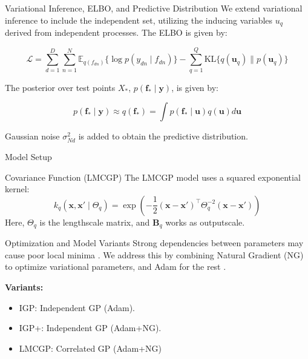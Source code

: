 \begin{frame}{Variational Inference, ELBO, and Predictive Distribution}
	We extend variational inference to include the independent set, utilizing the inducing variables $u_q$ derived from independent processes. The ELBO is given by:
	
	\begin{equation*}\label{eq:lmc_elbo}
		\mathcal{L} = \sum_{d=1}^D\sum_{n=1}^{N} \mathbb{E}_{q(f_{dn})}\{\log p(y_{dn} \mid f_{dn})\} - \sum_{q=1}^Q \text{KL}\{q(\mathbf{u}_q)\parallel p(\mathbf{u}_q)\}
	\end{equation*}
	
	The posterior over test points $X_*$, $p(\mathbf{f}_* \mid \mathbf{y})$, is given by:
	
	\begin{equation*}
		p(\mathbf{f}_* \mid \mathbf{y}) \approx q(\mathbf{f}_*) = \int p(\mathbf{f}_* \mid \mathbf{u}) q(\mathbf{u}) d \mathbf{u}
	\end{equation*}
	
	Gaussian noise $\sigma_{Nd}^2$ is added to obtain the predictive distribution.
\end{frame}

\begin{frame}{Model Setup}

	\begin{block}{Covariance Function (LMCGP)}
		The LMCGP model uses a squared exponential kernel:
		\begin{equation*}
			k_{q}\left(\mathbf{x}, \mathbf{x'} \mid \Theta_q \right) = \exp\left(-\frac{1}{2}(\mathbf{x} - \mathbf{x'})^\top \Theta_q^{-2} (\mathbf{x} - \mathbf{x'})\right)
		\end{equation*}
		Here, \( \Theta_q \) is the lengthscale matrix, and \( \mathbf{B}_q \) works as outputscale.
	\end{block}
	
	\begin{block}{Optimization and Model Variants}
		Strong dependencies between parameters may cause poor local minima \cite{giraldo2021fully}. We address this by combining Natural Gradient (NG) to optimize variational parameters, and Adam for the rest \cite{pmlr-v84-salimbeni18a}.

		\textbf{Variants:}
		\begin{itemize}
			\item IGP: Independent GP (Adam).
			\item IGP+: Independent GP (Adam+NG).
			\item LMCGP: Correlated GP (Adam+NG)
		\end{itemize}
	\end{block}
\end{frame}



